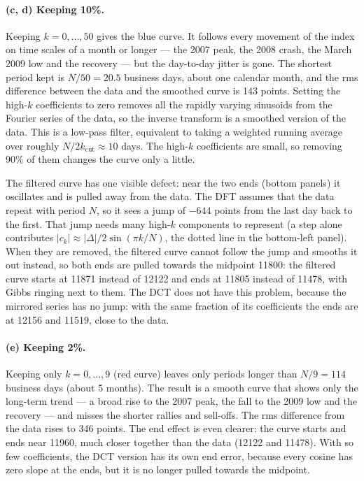 \documentclass[11pt]{article}
\begin{document}
\paragraph{(c, d) Keeping 10\%.}
Keeping $k=0,\dots,50$ gives the blue curve. It follows every movement of the
index on time scales of a month or longer --- the 2007 peak, the 2008 crash,
the March 2009 low and the recovery --- but the day-to-day jitter is gone. The
shortest period kept is $N/50 = 20.5$ business days, about one calendar month,
and the rms difference between the data and the smoothed curve is 143 points.
Setting the high-$k$ coefficients to zero removes all the rapidly varying
sinusoids from the Fourier series of the data, so the inverse transform is a
smoothed version of the data. This is a low-pass filter, equivalent to taking
a weighted running average over roughly $N/2k_{\mathrm{cut}}\approx10$ days.
The high-$k$ coefficients are small, so removing 90\% of them changes the curve
only a little.

The filtered curve has one visible defect: near the two ends (bottom panels) it
oscillates and is pulled away from the data. The DFT assumes that the data
repeat with period $N$, so it sees a jump of $-644$ points from the last day
back to the first. That jump needs many high-$k$ components to represent (a
step alone contributes $|c_k|\approx|\Delta|/2\sin(\pi k/N)$, the dotted line
in the bottom-left panel). When they are removed, the filtered curve cannot
follow the jump and smooths it out instead, so both ends are pulled towards the
midpoint 11800: the filtered curve starts at 11871 instead of 12122 and ends
at 11805 instead of 11478, with Gibbs ringing next to them. The DCT does not
have this problem, because the mirrored series has no jump: with the same
fraction of its coefficients the ends are at 12156 and 11519, close to the
data.

\paragraph{(e) Keeping 2\%.}
Keeping only $k=0,\dots,9$ (red curve) leaves only periods longer than
$N/9 = 114$ business days (about 5 months). The result is a smooth curve
that shows only the long-term trend --- a broad rise to the 2007 peak, the fall
to the 2009 low and the recovery --- and misses the shorter rallies and
sell-offs. The rms difference from the data rises to 346 points. The end effect
is even clearer: the curve starts and ends near 11960, much closer together
than the data (12122 and 11478). With so few coefficients, the DCT version has
its own end error, because every cosine has zero slope at the ends, but it is
no longer pulled towards the midpoint.
\end{document}
